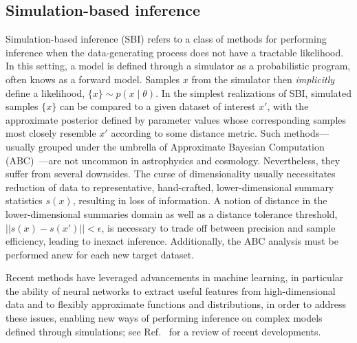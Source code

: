 \documentclass[prd,aps,10pt,nofootinbib,twocolumn,superscriptaddress,preprintnumbers,balancelastpage,longbibliography]{revtex4-1}
\begin{document}
\subsection{Simulation-based inference}


Simulation-based inference (SBI) refers to a class of methods for performing inference when the data-generating process does not have a tractable likelihood. In this setting, a model is defined through a simulator as a probabilistic program, often knows as a forward model. Samples ${x}$ from the simulator then \emph{implicitly} define a likelihood, $\{x\}\sim p(x\mid\theta)$. In the simplest realizations of SBI, simulated samples $\{x\}$ can be compared to a given dataset of interest $x'$, with the approximate posterior defined by parameter values whose corresponding samples most closely resemble $x'$ according to some distance metric. Such methods---usually grouped under the umbrella of Approximate Bayesian Computation (ABC)~\cite{10.1214/aos/1176346785}---are not uncommon in astrophysics and cosmology. Nevertheless, they suffer from several downsides. The curse of dimensionality usually necessitates reduction of data to representative, hand-crafted, lower-dimensional summary statistics $s(x)$, resulting in loss of information. A notion of distance in the lower-dimensional summaries domain as well as a distance tolerance threshold, $||s(x) - s(x')|| < \epsilon$, is necessary to trade off between precision and sample efficiency, leading to inexact inference. Additionally, the ABC analysis must be performed anew for each new target dataset.

Recent methods
have leveraged advancements in machine learning, in particular the ability of neural networks to extract useful features from high-dimensional data and to flexibly approximate functions and distributions, in order to address these issues, enabling new ways of performing inference on complex models defined through simulations; see Ref.~\cite{cranmer2020frontier} for a review of recent developments.
\end{document}
